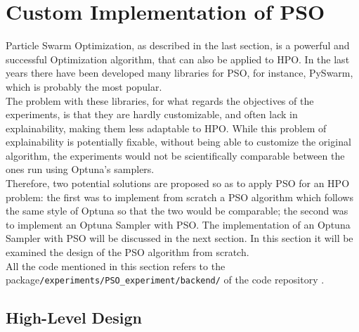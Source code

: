 \section{Custom Implementation of PSO}\label{sec:CustomImplementationOfPSO-3.2}

Particle Swarm Optimization, as described in the last section, is a powerful and successful Optimization algorithm, that can also be applied to HPO.
In the last years there have been developed many libraries for PSO, for instance, PySwarm, which is probably the most popular.
\\[0.3cm]The problem with these libraries, for what regards the objectives of the experiments, is that they are hardly customizable, and often lack in explainability, making them less adaptable to HPO.
While this problem of explainability is potentially fixable, without being able to customize the original algorithm, the experiments would not be scientifically comparable between the ones run using Optuna's samplers.
\\[0.3cm]Therefore, two potential solutions are proposed so as to apply PSO for an HPO problem: the first was to implement from scratch a PSO algorithm which follows the same style of Optuna so that the two would be comparable; the second was to implement an Optuna Sampler with PSO.
The implementation of an Optuna Sampler with PSO will be discussed in the next section. In this section it will be examined the design of the PSO algorithm from scratch.
\\[0.3cm]All the code mentioned in this section refers to the package\newline\texttt{/experiments/PSO\_experiment/backend/} of the code repository \cite{Repository-THESIS}.

\subsection{High-Level Design}

